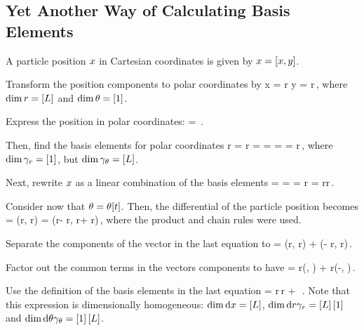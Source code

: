 \subsection{Yet Another Way of Calculating Basis Elements}
A particle position $x$ in Cartesian coordinates is given by $x = \left[{x,y}\right]$. 

Transform the position components to polar coordinates by
\beq
x = r\cos\vat\theta\qquad{}\qquad
y = r\sin\vat\theta\,,
\eeq
where $\dim r = \left[{L}\right]$ and $\dim\theta = \left[{1}\right]$. 

Express the position in polar coordinates:
\beq
\pvec = \,.
\eeq

Then, find the basis elements for polar coordinates
\beq
\ifvec r = \xpd\pvec r 
         = \tuple{\cos\vat\theta, \sin\vat\theta}\quad{}\quad
%
\ifvec \theta = \xpd\pvec\theta 
              = 
              = r\tuple{-\sin\vat\theta, \cos\vat\theta}\,,
\eeq
where $\dim{\gamma_{r}} = \left[{1}\right]$, but $\dim{\gamma_{\theta}} = \left[{L}\right] $.

Next, rewrite $x$ as a linear combination of the basis elements
\beq
\pvec = 
      = 
      = r\tuple{\cos\vat\theta, \sin\vat\theta}
      = r\ifvec r\,.
\eeq

Consider now that $\theta = \theta\!\left[{t}\right]$. Then, the differential of the particle position becomes
\beq
\dx\pvec = \dx\left(r\cos\vat\theta, r\sin\vat\theta\right)
         = \left(\dx r\cos\vat\theta - r\sin\vat\theta\dx\theta,
            \dx r\sin\vat\theta + r\cos\vat\theta\dx\theta\right)\,,
\eeq
where the product and chain rules were used.

Separate the components of the vector in the last equation to
\beq
\dx\pvec = \left(\dx r\cos\vat\theta, \dx r\sin\vat\theta\right) 
           + \left(- r\sin\vat\theta\dx\theta, r\cos\vat\theta\dx\theta\right)\,.
\eeq

Factor out the common terms in the vectors components to have
\beq
\dx\pvec = \dx r\left(\cos\vat\theta, \sin\vat\theta\right) 
           + r\dx\theta\left(-\sin\vat\theta, \cos\vat\theta\right)\,.
\eeq

Use the definition of the basis elements in the last equation
\beq
\dx\pvec = \dx r\,\ifvec r + \dx\theta\,\ifvec\theta\,.
\eeq
Note that this expression is dimensionally homogeneous: $\dim{\text{d}x} = \left[{L}\right]$, $\dim{\text{d}r\gamma_{r}} = \left[{L}\right]\left[{1}\right]$ and $\dim{\text{d}\theta\gamma_{\theta}} = \left[{1}\right]\left[{L}\right]$.

